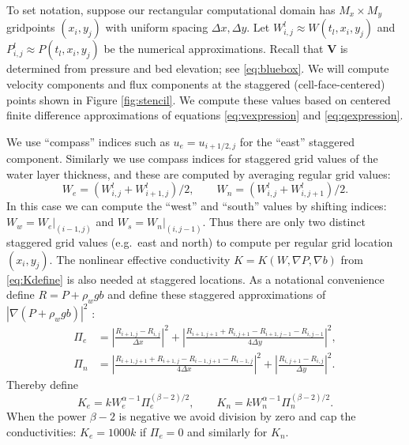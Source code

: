 \documentclass[11pt,final]{amsart}
\newcommand\bV{\mathbf{V}}
\newcommand{\grad}{\nabla}
\newcommand{\Wlij}{W^l_{i,j}}
\newcommand{\Plij}{P^l_{i,j}}
\begin{document}
To set notation, suppose our rectangular computational domain has $M_x \times M_y$ gridpoints $(x_i,y_j)$ with uniform spacing $\Delta x,\Delta y$.  Let $\Wlij \approx W(t_l,x_i,y_j)$ and $\Plij \approx P(t_l,x_i,y_j)$ be the numerical approximations.  Recall that $\bV$ is determined from pressure and bed elevation; see \eqref{eq:bluebox}.  We will compute velocity components and flux components at the staggered (cell-face-centered) points shown in Figure \ref{fig:stencil}.  We compute these values based on centered finite difference approximations of equations \eqref{eq:vexpression} and \eqref{eq:qexpression}.

We use ``compass'' indices such as $u_e = u_{i+1/2,j}$ for the ``east'' staggered component.  Similarly we use compass indices for staggered grid values of the water layer thickness, and these are computed by averaging regular grid values:
\begin{equation}
W_e = (W_{i,j}^l + W_{i+1,j}^l)/2, \qquad W_n = (W_{i,j}^l + W_{i,j+1}^l)/2. \label{eq:stagW}
\end{equation}
In this case we can compute the ``west'' and ``south'' values by shifting indices: $W_w = W_e\big|_{(i-1,j)}$ and $W_s = W_n\big|_{(i,j-1)}$.  Thus there are only two distinct staggered grid values (e.g.~east and north) to compute per regular grid location $(x_i,y_j)$.
The nonlinear effective conductivity $K=K(W,\grad P,\grad b)$ from \eqref{eq:Kdefine} is also needed at staggered locations.  As a notational convenience define $R=P+\rho_w g b$ and define these staggered approximations of $|\grad(P+\rho_w g b)|^2$ \citep[compare][]{Mahaffy}:
\begin{align*}
\Pi_e &= \left|\frac{R_{i+1,j}-R_{i,j}}{\Delta x}\right|^2 + \left|\frac{R_{i+1,j+1}+R_{i,j+1} - R_{i+1,j-1}-R_{i,j-1}}{4\Delta y}\right|^2, \\
\Pi_n &= \left|\frac{R_{i+1,j+1}+R_{i+1,j} - R_{i-1,j+1}-R_{i-1,j}}{4\Delta x}\right|^2 + \left|\frac{R_{i,j+1}-R_{i,j}}{\Delta y}\right|^2.
\end{align*}
Thereby define
\begin{equation}
K_e = k W_e^{\alpha-1} \Pi_e^{(\beta-2)/2}, \qquad K_n = k W_n^{\alpha-1} \Pi_n^{(\beta-2)/2}.  \label{eq:stagK}
\end{equation}
When the power $\beta-2$ is negative we avoid division by zero and cap the conductivities: $K_e = 1000 k$ if $\Pi_e = 0$ and similarly for $K_n$.
\end{document}
